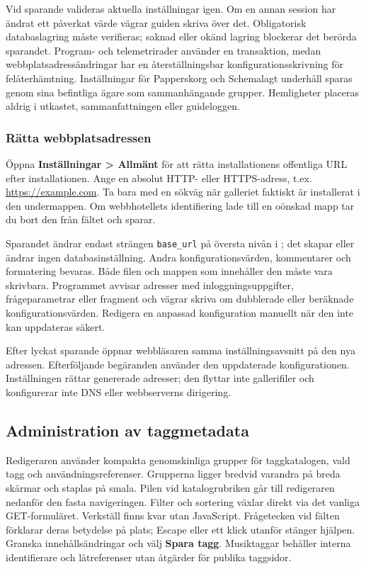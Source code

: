 \documentclass[11pt,a4paper]{article}
\newcommand{\filepath}[1]{\path{#1}}
\newcommand{\ui}[1]{\textbf{#1}}
\newcommand{\codeword}[1]{\nolinkurl{#1}}
\begin{document}
Vid sparande valideras aktuella inställningar igen. Om en annan session har
ändrat ett påverkat värde vägrar guiden skriva över det. Obligatorisk
databaslagring måste verifieras; saknad eller okänd lagring blockerar det
berörda sparandet. Program- och telemetrirader använder en transaktion, medan
webbplatsadressändringar har en återställningsbar konfigurationsskrivning för
felåterhämtning. Inställningar för Papperskorg och Schemalagt underhåll sparas
genom sina befintliga ägare som sammanhängande grupper. Hemligheter placeras
aldrig i utkastet, sammanfattningen eller guideloggen.

\subsubsection{Rätta webbplatsadressen}

Öppna \ui{Inställningar > Allmänt} för att rätta installationens offentliga URL
efter installationen. Ange en absolut HTTP- eller HTTPS-adress, t.ex.
\url{https://example.com}. Ta bara med en sökväg när galleriet faktiskt är
installerat i den undermappen. Om webbhotellets identifiering lade till en
oönskad mapp tar du bort den från fältet och sparar.

Sparandet ändrar endast strängen \codeword{base_url} på översta nivån i
\filepath{config.php}; det skapar eller ändrar ingen databasinställning. Andra
konfigurationsvärden, kommentarer och formatering bevaras. Både filen och mappen
som innehåller den måste vara skrivbara. Programmet avvisar adresser med
inloggningsuppgifter, frågeparametrar eller fragment och vägrar skriva om
dubblerade eller beräknade konfigurationsvärden. Redigera en anpassad
konfiguration manuellt när den inte kan uppdateras säkert.

Efter lyckat sparande öppnar webbläsaren samma inställningsavsnitt på den nya
adressen. Efterföljande begäranden använder den uppdaterade konfigurationen.
Inställningen rättar genererade adresser; den flyttar inte gallerifiler och
konfigurerar inte DNS eller webbserverns dirigering.

\subsection{Administration av taggmetadata}

Redigeraren använder kompakta genomskinliga grupper för taggkatalogen,
vald tagg och användningsreferenser. Grupperna ligger bredvid varandra på breda
skärmar och staplas på smala. Pilen vid katalogrubriken går till redigeraren
nedanför den fasta navigeringen. Filter och sortering växlar direkt via det
vanliga GET-formuläret.
Verkställ finns kvar utan JavaScript. Frågetecken vid fälten förklarar deras
betydelse på plats; Escape
eller ett klick utanför stänger hjälpen. Granska innehållsändringar och välj
\ui{Spara tagg}. Musiktaggar behåller interna identifierare och låtreferenser
utan åtgärder för publika taggsidor.
\end{document}
